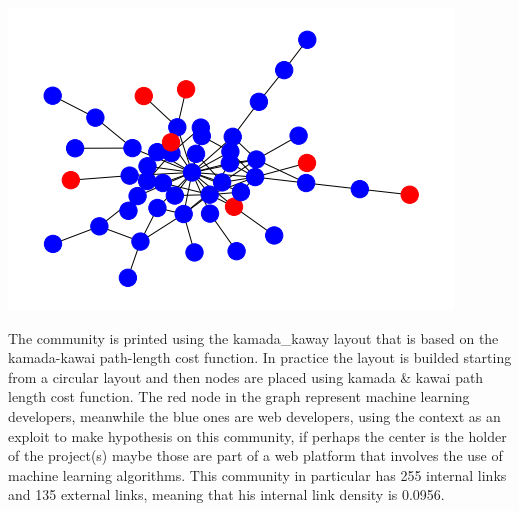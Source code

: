 \documentclass[]{article}
\begin{document}
    \begin{center}
        \includegraphics[]{charts/community14_graph.png}
    \end{center}
    The community is printed using the kamada_kaway layout that is based on the kamada-kawai path-length cost function. In practice the layout is builded starting from a circular layout and then nodes are placed using kamada & kawai path length cost function. The red node in the graph represent machine learning developers, meanwhile the blue ones are web developers, using the context as an exploit to make hypothesis on this community, if perhaps the center is the holder of the project(s) maybe those are part of a web platform that involves the use of machine learning algorithms. This community in particular has 255 internal links and 135 external links, meaning that his internal link density is 0.0956. 
    
    
\end{document}
